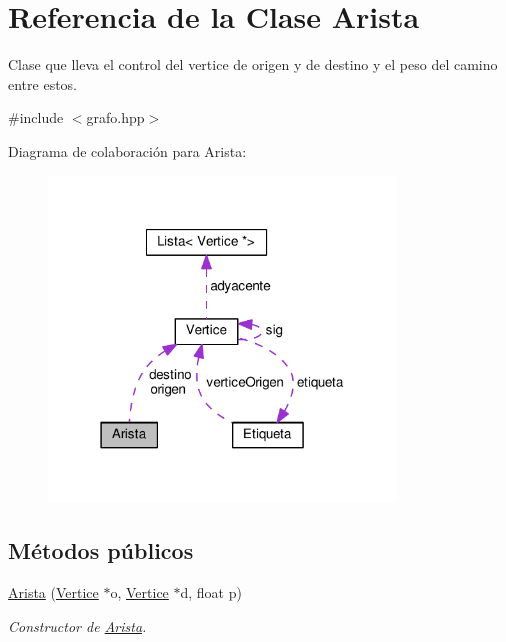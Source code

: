 \hypertarget{classArista}{}\section{Referencia de la Clase Arista}
\label{classArista}


Clase que lleva el control del vertice de \textquotesingle{}origen\textquotesingle{} y de \textquotesingle{}destino\textquotesingle{} y el peso del camino entre estos.  




{\ttfamily \#include $<$grafo.\+hpp$>$}



Diagrama de colaboración para Arista\+:\nopagebreak
\begin{figure}[H]
\begin{center}
\leavevmode
\includegraphics[width=262pt]{classArista__coll__graph}
\end{center}
\end{figure}
\subsection*{Métodos públicos}
\begin{DoxyCompactItemize}
\item 
\hyperlink{classArista_abfc5e334e70240f90b0f8d0cc094ad40}{Arista} (\hyperlink{classVertice}{Vertice} $\ast$o, \hyperlink{classVertice}{Vertice} $\ast$d, float p)
\begin{DoxyCompactList}\small\item\em Constructor de \hyperlink{classArista}{Arista}. \end{DoxyCompactList}\end{DoxyCompactItemize}
